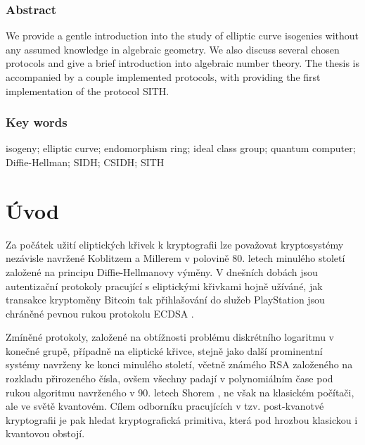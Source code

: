 \documentclass[12pt]{report}
\begin{document}
\vspace*{4cm}

\subsection*{Abstract}
We provide a gentle introduction into the study of elliptic curve isogenies without any assumed knowledge in algebraic geometry. We also discuss several chosen protocols and give a brief introduction into algebraic number theory. The thesis is accompanied by a couple implemented protocols, with providing the first implementation of the protocol SITH.

\subsection*{Key words}
isogeny; elliptic curve; endomorphism ring; ideal class group; quantum computer; Diffie-Hellman; SIDH; CSIDH; SITH





{
\hypersetup{linkcolor=black}
\tableofcontents
}
\thispagestyle{empty}

\chapter*{Úvod}

Za počátek užití eliptických křivek k kryptografii lze považovat kryptosystémy nezávisle navržené Koblitzem \cite{Koblitz} a Millerem \cite{Miller} v polovině 80. letech minulého století založené na principu Diffie-Hellmanovy \cite{Diffie} výměny. V dnešních dobách jsou autentizační protokoly pracující s eliptickými křivkami hojně užíváné, jak transakce kryptoměny Bitcoin tak přihlašování do služeb PlayStation jsou chráněné pevnou rukou protokolu ECDSA \cite{ECDSA}.

Zmíněné protokoly, založené na obtížnosti problému diskrétního logaritmu v konečné grupě, případně na eliptické křivce, stejně jako další prominentní systémy navrženy ke konci minulého století, včetně  známého RSA \cite{RSA} založeného na rozkladu přirozeného čísla, ovšem všechny padají v polynomiálním čase pod rukou algoritmu navrženého v 90. letech Shorem \cite{Shor}, ne však na klasickém počítači, ale ve světě kvantovém. Cílem odborníku pracujících v tzv. post-kvanotvé kryptografii je pak hledat kryptografická primitiva, která pod hrozbou klasickou i kvantovou obstojí.
\end{document}
